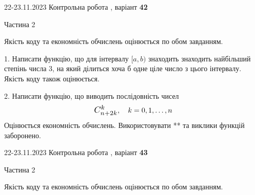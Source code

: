 \documentclass[12pt, ukrainian]{article}
\begin{document}
{{{{{{{{{{{{{\begin {Large}
\end{Large}\newpage




\begin {Huge}
{{22-23.11.2023 Контрольна робота , варіант  \No \textbf { 42 }\par}}

\begin{center}Частина 2
\end{center}
\vspace{10mm}
\end {Huge}

{
\begin {Large}
Якість коду та економність обчислень оцінюється по обом завданням.

\vspace{5mm}

1. Написати функцію, що для інтервалу $[a, b)$ знаходить знаходить найбільший степінь числа 3, на який ділиться хоча б одне ціле число з цього інтервалу.\\	Якість коду також оцінюється. 



\vspace{10mm}



2. 
Написати функцію, що виводить послідовність чисел
$$\scalebox{1.2}{$C_{n+2k}^{k}$}, \quad k=0,1,\ldots,n$$
Оцінюється економність обчислень. Використовувати ** та виклики функцій заборонено.

\end{Large}\newpage




\begin {Huge}
{{22-23.11.2023 Контрольна робота , варіант  \No \textbf { 43 }\par}}

\begin{center}Частина 2
\end{center}
\vspace{10mm}
\end {Huge}

{
\begin {Large}
Якість коду та економність обчислень оцінюється по обом завданням.

\vspace{5mm}


\end{Large}}}}}}}}}}}}}}}}
\end{document}
